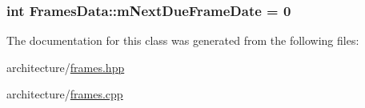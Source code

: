 \subsubsection[{\texorpdfstring{m\+Next\+Due\+Frame\+Date}{mNextDueFrameDate}}]{\setlength{\rightskip}{0pt plus 5cm}int Frames\+Data\+::m\+Next\+Due\+Frame\+Date = 0\hspace{0.3cm}{\ttfamily [static]}}\hypertarget{class_frames_data_ac0c60108ce1672499d5d69d9c8ea9111}{}\label{class_frames_data_ac0c60108ce1672499d5d69d9c8ea9111}


The documentation for this class was generated from the following files\+:\begin{DoxyCompactItemize}
\item 
architecture/\hyperlink{frames_8hpp}{frames.\+hpp}\item 
architecture/\hyperlink{frames_8cpp}{frames.\+cpp}\end{DoxyCompactItemize}
